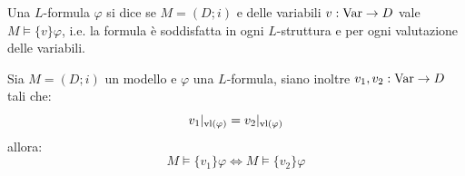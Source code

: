 \begin{definition}
    Una $L$-formula $\varphi$ si dice  se  $M = (D;i)$ e  delle variabili $v : \operatorname{Var} \to D$ vale $M \models \{v\}\varphi$, i.e. la formula è soddisfatta in ogni $L$-struttura e per ogni valutazione delle variabili.
\end{definition}

\begin{remark}
    Sia $M = (D;i)$ un modello e $\varphi$ una $L$-formula, siano inoltre $v_1,v_2 : \operatorname{Var} \to D$ tali che:
    \[ v_1|_{\operatorname{vl}(\varphi)} = v_2|_{\operatorname{vl}(\varphi)}
    \]
    allora:
    \[ M \models \{v_1\} \varphi \iff M \models \{v_2\} \varphi
    \] 
\end{remark}

